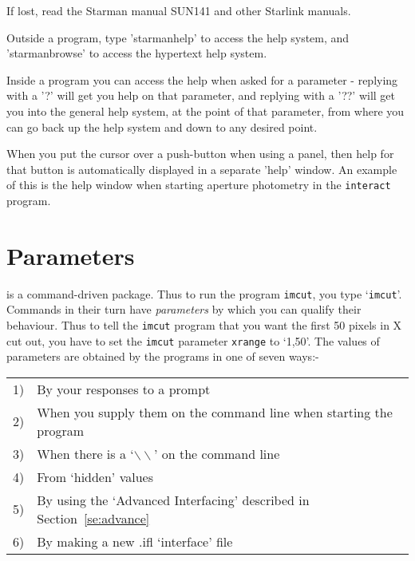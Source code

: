 If lost, read the Starman manual SUN141 and other Starlink manuals.

Outside a program, type 'starmanhelp' to access the help system, and
  'starmanbrowse' to access the hypertext help system.


  Inside a program you can access the help when asked for a  parameter
  - replying with a '?' will get you help on that parameter, and
  replying with a '??' will get you into the general help system, at
  the point of that parameter, from where you can go back up the  help
  system and down to any desired point.


When you put the cursor over a push-button when using a panel, then
help for that button is automatically displayed in a separate 'help'
window. An example of this is the help window when starting aperture
photometry in the \verb|interact| program.






\section{Parameters} \label{se:param}

\starman is a command-driven package.  Thus to run the program
\verb|imcut|, you  type `\verb|imcut|'. Commands in their turn have
{\em parameters\/} by which you can qualify their behaviour. Thus to
tell the \verb|imcut| program that you want the first 50 pixels in X
cut out, you have to set the \verb|imcut| parameter \verb|xrange| to
`1,50'. The values of parameters are obtained by the programs in one of
seven ways:-

\begin{tabular}{ll}
\hspace{4ex} 1) & By your responses to a prompt \\
\hspace{4ex} 2) & When you supply them on the command line when starting
		  the program \\
\hspace{4ex} 3) & When there is a `$\backslash\backslash$' on the
                  command line \\
\hspace{4ex} 4) & From `hidden' values \\
\hspace{4ex} 5) & By using the `Advanced Interfacing' described in
                  Section~\ref{se:advance} \\
\hspace{4ex} 6) & By making a new .ifl `interface' file \\
\end{tabular}


